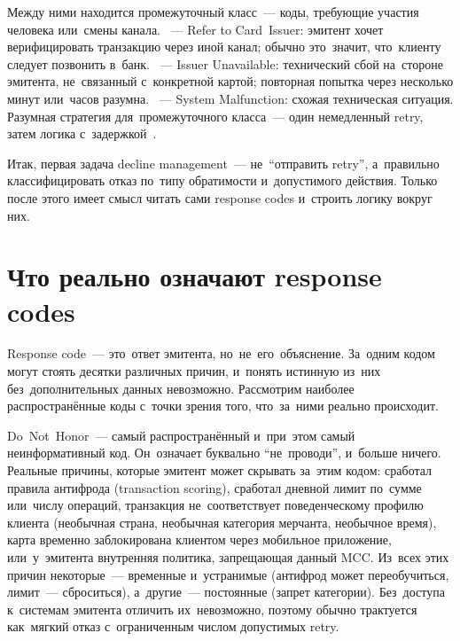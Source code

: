 Между ними находится промежуточный класс~--- коды, требующие участия человека
или~смены канала. ~--- Refer to Card~Issuer: эмитент хочет
верифицировать транзакцию через иной канал; обычно это~значит, что~клиенту
следует позвонить в~банк. ~--- Issuer Unavailable: технический
сбой на~стороне эмитента, не~связанный с~конкретной картой; повторная
попытка через несколько минут или~часов разумна. ~---
System Malfunction: схожая техническая ситуация. Разумная стратегия
для~промежуточного класса~--- один немедленный retry, затем логика
с~задержкой~.



Итак, первая задача decline management~--- не~\enquote{отправить
retry}, а~правильно классифицировать отказ по~типу обратимости
и~допустимого действия. Только после этого имеет смысл читать
сами response codes и~строить логику вокруг них.

\section{Что реально означают response codes}
\label{sec:decline-response-codes}

Response code~--- это~ответ эмитента, но~не~его~объяснение. За~одним
кодом могут стоять десятки различных причин, и~понять истинную из~них
без~дополнительных данных невозможно. Рассмотрим наиболее распространённые
коды с~точки зрения того, что~за~ними реально происходит.

 Do~Not~Honor~--- самый распространённый и~при~этом
самый неинформативный код. Он~означает буквально \enquote{не~проводи},
и~больше ничего. Реальные причины, которые эмитент может скрывать
за~этим кодом: сработал правила антифрода (transaction scoring), сработал
дневной лимит по~сумме или~числу операций, транзакция не~соответствует
поведенческому профилю клиента (необычная страна, необычная категория
мерчанта, необычное время), карта временно заблокирована клиентом
через мобильное приложение, или~у~эмитента внутренняя политика,
запрещающая данный MCC. Из~всех этих причин некоторые~--- временные
и~устранимые (антифрод может переобучиться, лимит~--- сброситься), а~другие~---
постоянные (запрет категории). Без~доступа к~системам эмитента отличить
их~невозможно, поэтому  обычно трактуется как~мягкий отказ
с~ограниченным числом допустимых retry.

